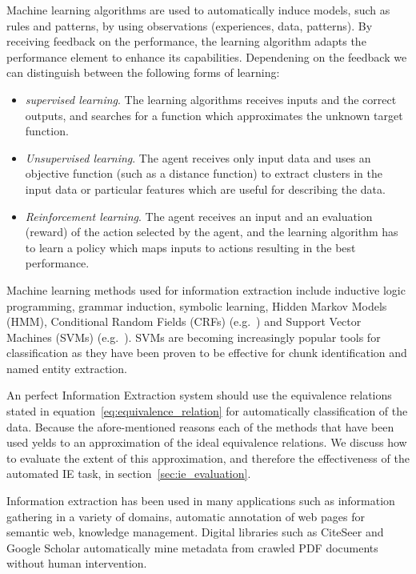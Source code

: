 Machine learning algorithms are used to automatically induce models, such as rules and patterns, by using observations (experiences, data, patterns). By receiving feedback on the performance, the learning algorithm adapts the performance element to enhance its capabilities. Dependening on the feedback we can distinguish between the following forms of learning:
\begin{itemize}
 \item \emph{supervised learning}. The learning algorithms receives inputs and the correct outputs, and searches for a function which approximates the unknown target function.
 \item \emph{Unsupervised learning}. The agent receives only input data and uses an objective function (such as a distance function) to extract clusters in the input data or particular features which are useful for describing the data.
 \item \emph{Reinforcement learning}. The agent receives an input and an evaluation (reward) of the action selected by the agent, and the learning algorithm has to learn a policy which maps inputs to actions resulting in the best performance.
\end{itemize}

Machine learning methods used for information extraction \cite{dietterich2002mls} include inductive logic programming, grammar induction, symbolic learning, Hidden Markov Models (HMM), Conditional Random Fields (CRFs) (e.g.\ \cite{peng2004aie}) and Support Vector Machines (SVMs) (e.g.\ \cite{han2003adm, kudoh2000usv, seymore1999lhm}). SVMs are becoming increasingly popular tools for classification as they have been proven to be effective for chunk identification and named entity extraction.

An perfect Information Extraction system should use the equivalence relations stated in equation~\ref{eq:equivalence_relation} for automatically classification of the data. Because  the afore-mentioned reasons each of the methods that have been used yelds to an approximation of the ideal equivalence relations. We discuss how to evaluate the extent of this approximation, and therefore the effectiveness of the automated IE task, in section~\ref{sec:ie_evaluation}.

Information extraction has been used in many applications such as information gathering in a variety of domains, automatic annotation of web pages for semantic web, knowledge management. Digital libraries such as CiteSeer \cite{lawrence1999dla,giles1998cac,bollacker1998caw} and Google Scholar automatically mine metadata from crawled PDF documents without human intervention.


